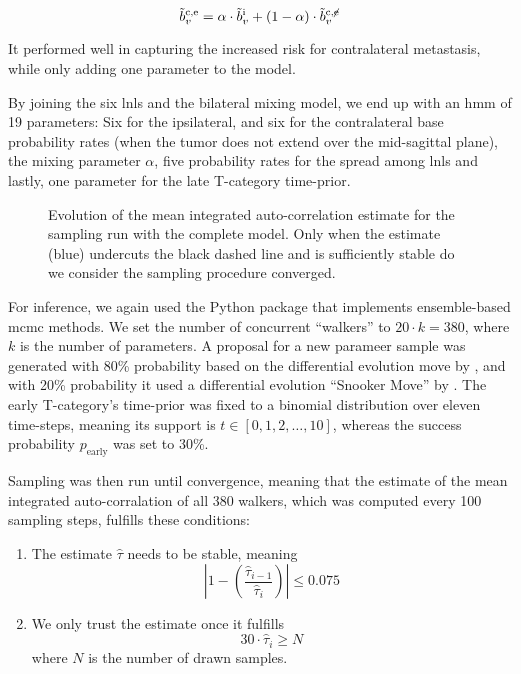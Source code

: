 \documentclass[\relativeRoot/main.tex]{subfiles}
\begin{document}
\begin{equation}
    \tilde{b}_v^\text{c,e} = \alpha \cdot \tilde{b}_v^\text{i} + (1 - \alpha) \cdot \tilde{b}_v^{\text{c},\centernot{\text{e}}}
\end{equation}

It performed well in capturing the increased risk for contralateral metastasis, while only adding one parameter to the model.

By joining the six \glspl{lnl} and the bilateral mixing model, we end up with an \gls{hmm} of 19 parameters: Six for the ipsilateral, and six for the contralateral base probability rates (when the tumor does not extend over the mid-sagittal plane), the mixing parameter $\alpha$, five probability rates for the spread among \glspl{lnl} and lastly, one parameter for the late T-category time-prior.

\begin{figure}
    \centering
    \def\svgwidth{0.7\textwidth}
    
    \caption[
        Mean integrated auto-correlation over the complete model's run
    ]{
        Evolution of the mean integrated auto-correlation estimate for the sampling run with the complete model. Only when the estimate (blue) undercuts the black dashed line and is sufficiently stable do we consider the sampling procedure converged.
    }
    \label{fig:complete:acor}
\end{figure}

For inference, we again used the  Python package that implements ensemble-based \gls{mcmc} methods. We set the number of concurrent ``walkers'' to $20 \cdot k = 380$, where $k$ is the number of parameters. A proposal for a new parameer sample was generated with 80\% probability based on the differential evolution move by , and with 20\% probability it used a differential evolution ``Snooker Move'' by . The early T-category's time-prior was fixed to a binomial distribution over eleven time-steps, meaning its support is $t \in \left[0, 1, 2, \ldots, 10\right]$, whereas the success probability $p_\text{early}$ was set to 30\%.

Sampling was then run until convergence, meaning that the estimate of the mean integrated auto-corralation of all 380 walkers, which was computed every 100 sampling steps, fulfills these conditions:

\begin{enumerate}[label={(\arabic*)}]
    \item The estimate $\hat{\tau}$ needs to be stable, meaning
    \begin{equation}
        \left| 1 - \left( \frac{\hat{\tau}_{i-1}}{\hat{\tau}_i} \right) \right| \leq 0.075
    \end{equation}
    \item We only trust the estimate once it fulfills
    \begin{equation}
        30 \cdot \hat{\tau}_i \geq N
    \end{equation}
    where $N$ is the number of drawn samples.
\end{enumerate}
\end{document}
